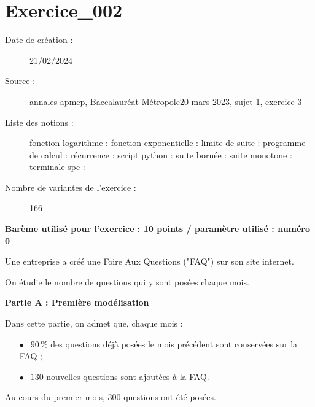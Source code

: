 \SeulementModeEnonce{}




\section{Exercice\_002}

\begin{description}
\item[Date de création : ]21/02/2024
\item[Source : ]annales apmep, Baccalauréat Métropole20 mars 2023, sujet 1, exercice 3
\item[Liste des notions : ]fonction logarithme : fonction exponentielle : limite de suite : programme de calcul : récurrence : script python : suite bornée : suite monotone : terminale spe : 
\item[Nombre de variantes de l'exercice : ]166
\end{description}

\centerline{\bf\large Barème utilisé pour l'exercice : 10 points / paramètre utilisé : numéro 0}



\EXERCICE {}

\medskip

Une entreprise a créé une Foire Aux Questions ("FAQ") sur son site internet.

\medskip

On étudie le nombre de questions qui y sont posées chaque mois.

\bigskip

\textbf{Partie A : Première modélisation}

\medskip

Dans cette partie, on admet que, chaque mois :

\begin{itemize}
\item[$\bullet~~$]$90$\,\% des questions déjà posées le mois précédent sont conservées sur la FAQ ;
\item[$\bullet~~$]$130$ nouvelles questions sont ajoutées à la FAQ.
\end{itemize}

Au cours du premier mois, $300$ questions ont été posées.

